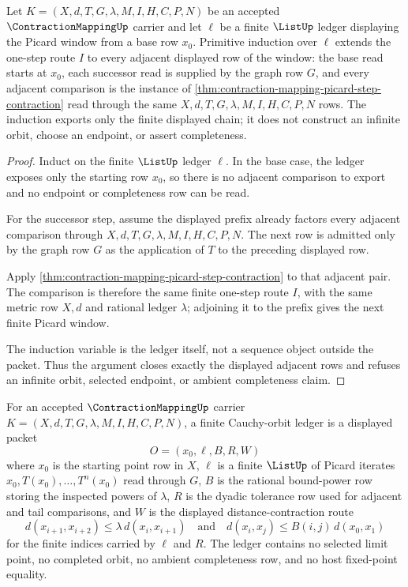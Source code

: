 \begin{theorem}
\label{thm:contraction-mapping-orbit-induction-spine}
Let $K=(X,d,T,G,\lambda,M,I,H,C,P,N)$ be an accepted $\ContractionMappingUp$ carrier and let $\ell$ be a finite $\ListUp$ ledger displaying the Picard window from a base row $x_0$. Primitive induction over $\ell$ extends the one-step route $I$ to every adjacent displayed row of the window: the base read starts at $x_0$, each successor read is supplied by the graph row $G$, and every adjacent comparison is the instance of \autoref{thm:contraction-mapping-picard-step-contraction} read through the same $X,d,T,G,\lambda,M,I,H,C,P,N$ rows. The induction exports only the finite displayed chain; it does not construct an infinite orbit, choose an endpoint, or assert completeness.
\end{theorem}
\begin{proof}
Induct on the finite $\ListUp$ ledger $\ell$. In the base case, the ledger exposes only the starting row $x_0$, so there is no adjacent comparison to export and no endpoint or completeness row can be read.

For the successor step, assume the displayed prefix already factors every adjacent comparison through $X,d,T,G,\lambda,M,I,H,C,P,N$. The next row is admitted only by the graph row $G$ as the application of $T$ to the preceding displayed row.

Apply \autoref{thm:contraction-mapping-picard-step-contraction} to that adjacent pair. The comparison is therefore the same finite one-step route $I$, with the same metric row $X,d$ and rational ledger $\lambda$; adjoining it to the prefix gives the next finite Picard window.

The induction variable is the ledger itself, not a sequence object outside the packet. Thus the argument closes exactly the displayed adjacent rows and refuses an infinite orbit, selected endpoint, or ambient completeness claim.
\end{proof}

\begin{definition}
\label{def:contraction-mapping-cauchy-orbit-ledger}
For an accepted $\ContractionMappingUp$ carrier $K=(X,d,T,G,\lambda,M,I,H,C,P,N)$, a finite Cauchy-orbit ledger is a displayed packet
$$
O=(x_0,\ell,B,R,W)
$$
where $x_0$ is the starting point row in $X$, $\ell$ is a finite $\ListUp$ of Picard iterates $x_0,T(x_0),\ldots,T^n(x_0)$ read through $G$, $B$ is the rational bound-power row storing the inspected powers of $\lambda$, $R$ is the dyadic tolerance row used for adjacent and tail comparisons, and $W$ is the displayed distance-contraction route
$$
d(x_{i+1},x_{i+2})\leq \lambda\,d(x_i,x_{i+1})
\quad\text{and}\quad
d(x_i,x_j)\leq B(i,j)\,d(x_0,x_1)
$$
for the finite indices carried by $\ell$ and $R$.
The ledger contains no selected limit point, no completed orbit, no ambient completeness row, and no host fixed-point equality.
\end{definition}

